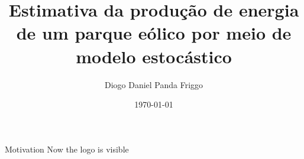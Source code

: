 \documentclass{beamer}
\title[]{Estimativa da produção de energia de um parque eólico por meio de modelo estocástico}
\author[]{Diogo Daniel Panda Friggo}
\institute[Inst.]{The Institute}
\date{\today}
\begin{document}
\begin{frame}
\maketitle
\end{frame}

\begin{frame}{Motivation}
Now the logo is visible
\end{frame}
\end{document}
